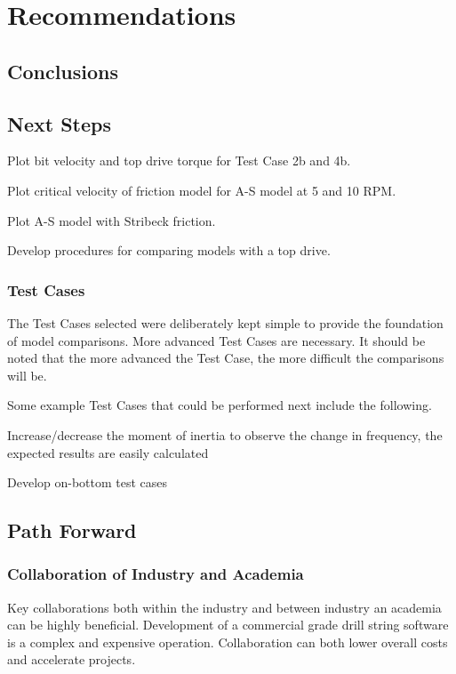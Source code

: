 \chapter{Recommendations}
\section{Conclusions}

\section{Next Steps}
\begin{bulletedlist}
	\item Plot bit velocity and top drive torque for Test Case 2b and 4b.
	\item Plot critical velocity of friction model for A-S model at 5 and 10 RPM.
	\item Plot A-S model with Stribeck friction.
	\item Develop procedures for comparing models with a top drive.
\end{bulletedlist}

\subsection{Test Cases}
The Test Cases selected were deliberately kept simple to provide the foundation of model comparisons.  More advanced Test Cases are necessary.  It should be noted that the more advanced the Test Case, the more difficult the comparisons will be.

Some example Test Cases that could be performed next include the following.
\begin{bulletedlist}
	\item Increase/decrease the moment of inertia to observe the change in frequency, the expected results are easily calculated
	\item Develop on-bottom test cases
\end{bulletedlist}

\section{Path Forward}
\subsection{Collaboration of Industry and Academia}
Key collaborations both within the industry and between industry an academia can be highly beneficial.  Development of a commercial grade drill string software is a complex and expensive operation.  Collaboration can both lower overall costs and accelerate projects.

